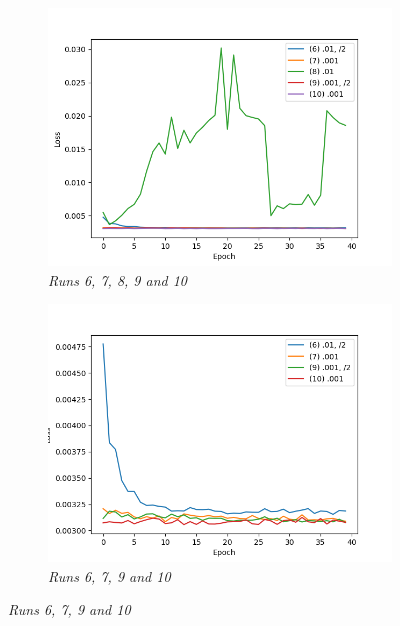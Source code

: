 \documentclass{article}
\begin{document}
            \begin{figure}[!ht]
                \begin{subfigure}{.33\linewidth}
                    \centering
                    \includegraphics[width=\linewidth]{pics/hpp-lr-loss-678910.png}
                    \caption{\textit{Runs 6, 7, 8, 9 and 10}}
                \end{subfigure}
                \begin{subfigure}{.33\linewidth}
                    \centering
                    \includegraphics[width=\linewidth]{pics/hpp-lr-loss-67910.png}
                    \caption{\textit{Runs 6, 7, 9 and 10}}
                \end{subfigure}

\end{figure}
\end{document}
